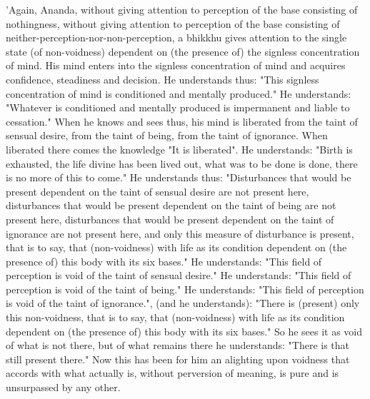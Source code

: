 \documentclass[11pt]{article}
\begin{document}
\begin{paracol}{2}
\begin{column}
'Again, Ananda, without giving attention to perception of the base consisting of nothingness, without giving attention to perception of the base consisting of neither-perception-nor-non-perception, a bhikkhu gives attention to the single state (of non-voidness) dependent on (the presence of) the signless concentration of mind. His mind enters into the signless concentration of mind and acquires confidence, steadiness and decision. He understands thus: "This signless concentration of mind is conditioned and mentally produced." He understands: "Whatever is conditioned and mentally produced is impermanent and liable to cessation." When he knows and sees thus, his mind is liberated from the taint of sensual desire, from the taint of being, from the taint of ignorance. When liberated there comes the knowledge "It is liberated". He understands: "Birth is exhausted, the life divine has been lived out, what was to be done is done, there is no more of this to come." He understands thus: "Disturbances that would be present dependent on the taint of sensual desire are not present here, disturbances that would be present dependent on the taint of being are not present here, disturbances that would be present dependent on the taint of ignorance are not present here, and only this measure of disturbance is present, that is to say, that (non-voidness) with life as its condition dependent on (the presence of) this body with its six bases." He understands: "This field of perception is void of the taint of sensual desire." He understands: "This field of perception is void of the taint of being." He understands: "This field of perception is void of the taint of ignorance.", (and he understands): "There is (present) only this non-voidness, that is to say, that (non-voidness) with life as its condition dependent on (the presence of) this body with its six bases." So he sees it as void of what is not there, but of what remains there he understands: "There is that still present there." Now this has been for him an alighting upon voidness that accords with what actually is, without perversion of meaning, is pure and is unsurpassed by any other.
\switchcolumn

\end{column}
\end{paracol}
\end{document}
